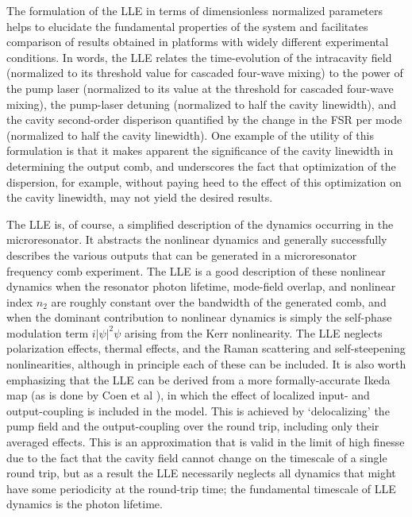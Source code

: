 The formulation of the LLE in terms of dimensionless normalized parameters helps to elucidate the fundamental properties of the system and facilitates comparison of results obtained in platforms with widely different experimental conditions. In words, the LLE relates the time-evolution of the intracavity field (normalized to its threshold value for cascaded four-wave mixing) to the power of the pump laser (normalized to its value at the threshold for cascaded four-wave mixing), the pump-laser detuning (normalized to half the cavity linewidth), and the cavity second-order disperison quantified by the change in the FSR per mode (normalized to half the cavity linewidth). One example of the utility of this formulation is that it makes apparent the significance of the cavity linewidth in determining the output comb, and underscores the fact that optimization of the dispersion, for example, without paying heed to the effect of this optimization on the cavity linewidth, may not yield the desired results.

The LLE is, of course, a simplified description of the dynamics occurring in the microresonator. It abstracts the nonlinear dynamics and generally successfully describes the various outputs that can be generated in a microresonator frequency comb experiment. The LLE is a good description of these nonlinear dynamics when the resonator photon lifetime, mode-field overlap, and nonlinear index $n_2$ are roughly constant over the bandwidth of the generated comb, and when the dominant contribution to nonlinear dynamics is simply the self-phase modulation term $i|\psi|^2\psi$ arising from the Kerr nonlinearity. The LLE neglects polarization effects, thermal effects, and the Raman scattering and self-steepening nonlinearities, although in principle each of these can be included. It is also worth emphasizing that the LLE can be derived from a more formally-accurate Ikeda map (as is done by Coen et al \cite{Coen2013a}), in which the effect of localized input- and output-coupling is included in the model. This is achieved by `delocalizing' the pump field and the output-coupling over the round trip, including only their averaged effects. This is an approximation that is valid in the limit of high finesse due to the fact that the cavity field cannot change on the timescale of a single round trip, but as a result the LLE necessarily neglects all dynamics that might have some periodicity at the round-trip time; the fundamental timescale of LLE dynamics is the photon lifetime. 

